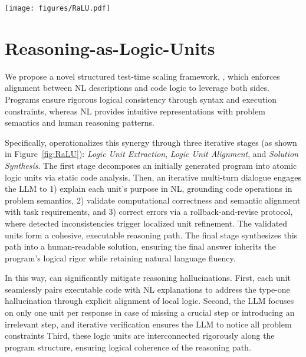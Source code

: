 \begin{figure*}[htbp]
    \centering
    \vspace{-0.1in}
        {\texttt{[image: figures/RaLU.pdf]}}
    \vspace{-0.1in}
    \caption{Illustrating the three-stage process of \tool: Logic Unit Extraction, Logic Unit Alignment, and Solution Synthesis for operationalizing synergy in reasoning tasks.}
    \vspace{-0.2in}
    \label{fig:RaLU}
\end{figure*}

\section{Reasoning-as-Logic-Units}
We propose a novel structured test-time scaling framework, \tool, which enforces alignment between NL descriptions and code logic to leverage both sides. Programs ensure rigorous logical consistency through syntax and execution constraints, whereas NL provides intuitive representations with problem semantics and human reasoning patterns.

Specifically, \tool operationalizes this synergy through three iterative stages (as shown in Figure~\ref{fig:RaLU}): \textit{Logic Unit Extraction}, \textit{Logic Unit Alignment}, and \textit{Solution Synthesis}.
The first stage decomposes an initially generated program into atomic logic units via static code analysis. Then, an iterative multi-turn dialogue engages the LLM to 1) explain each unit’s purpose in NL, grounding code operations in problem semantics, 2) validate computational correctness and semantic alignment with task requirements, and 3) correct errors via a rollback-and-revise protocol, where detected inconsistencies trigger localized unit refinement. The validated units form a cohesive, executable reasoning path. The final stage synthesizes this path into a human-readable solution, ensuring the final answer inherits the program’s logical rigor while retaining natural language fluency.

In this way, \tool can significantly mitigate reasoning hallucinations.
First, each unit seamlessly pairs executable code with NL explanations to address the type-one hallucination through explicit alignment of local logic.
Second, the LLM focuses on only one unit per response in case of missing a crucial step or introducing an irrelevant step, and iterative verification ensures the LLM to notice all problem constraints
Third, these logic units are interconnected rigorously along the program structure, ensuring logical coherence of the reasoning path.

